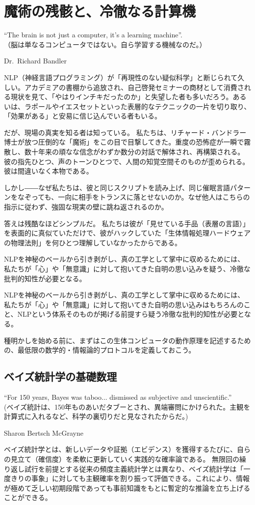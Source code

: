 \chapter{魔術の残骸と、冷徹なる計算機}
\epigraph{``The brain is not just a computer, it's a learning machine''.\\（脳は単なるコンピュータではない。自ら学習する機械なのだ。）}{Dr.~Richard Bandler}
NLP（神経言語プログラミング）が「再現性のない疑似科学」と断じられて久しい。アカデミアの書棚から追放され、自己啓発セミナーの商材として消費される現状を見て、「やはりインチキだったのか」と失望した者も多いだろう。あるいは、ラポールやイエスセットといった表層的なテクニックの一片を切り取り、「効果がある」と安易に信じ込んでいる者もいる。

だが、現場の真実を知る者は知っている。
私たちは、リチャード・バンドラー博士が放つ圧倒的な「魔術」をこの目で目撃してきた。重度の恐怖症が一瞬で霧散し、数十年来の頑なな信念がわずか数分の対話で解体され、再構築される。彼の指先ひとつ、声のトーンひとつで、人間の知覚空間そのものが歪められる。彼は間違いなく本物である。

しかし――なぜ私たちは、彼と同じスクリプトを読み上げ、同じ催眠言語パターンをなぞっても、一向に相手をトランスに落とせないのか。なぜ他人はこちらの指示に従わず、強固な現実の壁に跳ね返されるのか。

答えは残酷なほどシンプルだ。
私たちは彼が「見せている手品（表層の言語）」を表面的に真似ていただけで、彼がハックしていた「生体情報処理ハードウェアの物理法則」を何ひとつ理解していなかったからである。

NLPを神秘のベールから引き剥がし、真の工学として掌中に収めるためには、私たちが「心」や「無意識」に対して抱いてきた自明の思い込みを疑う、冷徹な批判的知性が必要となる。

NLPを神秘のベールから引き剥がし、真の工学として掌中に収めるためには、私たちが「心」や「無意識」に対して抱いてきた自明の思い込みはもちろんのこと、NLPという体系そのものが掲げる前提すら疑う冷徹な批判的知性が必要となる。

種明かしを始める前に、まずはこの生体コンピュータの動作原理を記述するための、最低限の数学的・情報論的プロトコルを定義しておこう。

\section{ベイズ統計学の基礎数理}
\epigraph{``For 150 years, Bayes was taboo... dismissed as subjective and unscientific.''\\(ベイズ統計は、150年ものあいだタブーとされ、異端審問にかけられた。主観を計算式に入れるなど、科学の裏切りだと見なされたからだ。)}{Sharon Bertsch McGrayne}
ベイズ統計学とは、新しいデータや証拠（エビデンス）を獲得するたびに、自らの見立て（確信度）を柔軟に更新していく実践的な確率論である。
無限回の繰り返し試行を前提とする従来の頻度主義統計学とは異なり、ベイズ統計学は「一度きりの事象」に対しても主観確率を割り振って評価できる。これにより、情報が極めて乏しい初期段階であっても事前知識をもとに暫定的な推論を立ち上げることができる。


